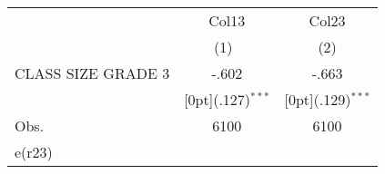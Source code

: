 \documentclass[a4paper,11pt]{article}
\begin{document}
\begin{table}
\begin{tabular*}{\textwidth}{@{\extracolsep{\fill}}lcc}		
	& \multicolumn{1}{c}{Col13} &	\multicolumn{1}{c}{Col23} \\
	\cline{2-3}		
	& \multicolumn{1}{c}{(1)\mbox{\ }} &	\multicolumn{1}{c}{(2)} \\
	\hline		
	CLASS SIZE GRADE 3 &	-.602 &	-.663 \\
	&	\raisebox{.7ex}[0pt]{\scriptsize (.127)$^{***}$} &	\raisebox{.7ex}[0pt]{\scriptsize (.129)$^{***}$} \\
	Obs. &	6100 &	6100 \\
	e(r23) &	&	\\
	\hline\hline		
\end{tabular*}	

\end{table}
\end{document}
